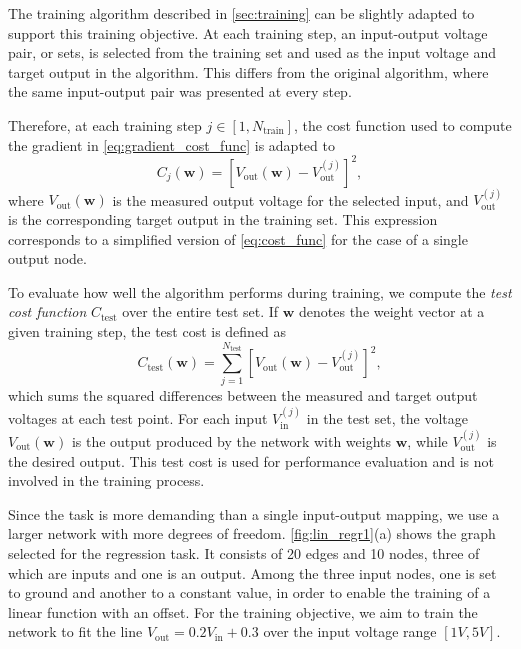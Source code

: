 \documentclass[reprint,superscriptaddress,prb,showkeys]{revtex4-2}
\begin{document}
The training algorithm described in \cref{sec:training} can be slightly adapted to support this training objective. At each training step, an input-output voltage pair, or sets, is selected from the training set and used as the input voltage and target output in the algorithm. This differs from the original algorithm, where the same input-output pair was presented at every step.

Therefore, at each training step $ j \in[1, N_{\text{train}}] $, the cost function used to compute the gradient in \cref{eq:gradient_cost_func} is adapted to
\[
C_j(\boldsymbol{w}) = \left[ V_{\text{out}}(\boldsymbol{w}) - V_{\text{out}}^{(j)} \right]^2,
\]
where $ V_{\text{out}}(\boldsymbol{w}) $ is the measured output voltage for the selected input, and $ V_{\text{out}}^{(j)} $ is the corresponding target output in the training set. This expression corresponds to a simplified version of \cref{eq:cost_func} for the case of a single output node.

To evaluate how well the algorithm performs during training, we compute the \emph{test cost function} $ C_{\text{test}} $ over the entire test set. If $ \boldsymbol{w} $ denotes the weight vector at a given training step, the test cost is defined as
\[
C_{\text{test}}\left( \boldsymbol{w} \right) = \sum_{j=1}^{N_{\text{test}}} \left[ V_{\text{out}}(\boldsymbol{w}) - V_{\text{out}}^{(j)} \right]^2,
\]
which sums the squared differences between the measured and target output voltages at each test point. For each input $V_{\text{in}}^{(j)}$ in the test set, the voltage $ V_{\text{out}}(\boldsymbol{w}) $ is the output produced by the network with weights $ \boldsymbol{w} $, while $ V_{\text{out}}^{(j)} $ is the desired output. This test cost is used for performance evaluation and is not involved in the training process.

Since the task is more demanding than a single input-output mapping, we use a larger network with more degrees of freedom. \cref{fig:lin_regr1}(a) shows the graph selected for the regression task. It consists of 20 edges and 10 nodes, three of which are inputs and one is an output. Among the three input nodes, one is set to ground and another to a constant value, in order to enable the training of a linear function with an offset. For the training objective, we aim to train the network to fit the line $V_{\text{out}} = 0.2 V_{\text{in}} + 0.3$ over the input voltage range $[1V, 5V]$.
\end{document}
